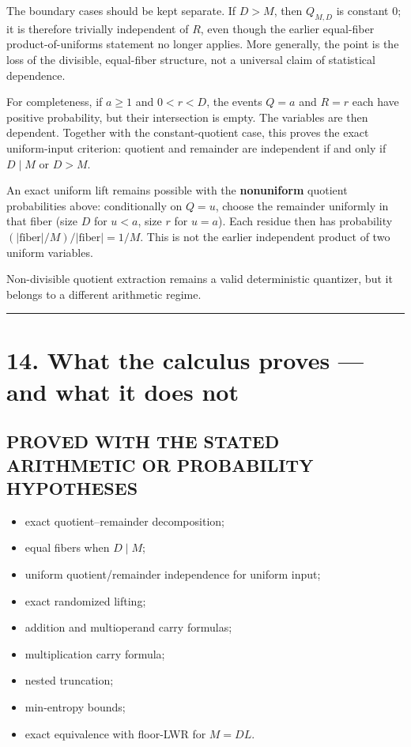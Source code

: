 \documentclass[11pt,a4paper]{article}
\providecommand{\tightlist}{\setlength{\itemsep}{0pt}\setlength{\parskip}{0pt}}
\begin{document}
The boundary cases should be kept separate. If \(D>M\), then \(Q_{M,D}\) is constant \(0\); it is therefore trivially independent of \(R\), even though the earlier equal-fiber product-of-uniforms statement no longer applies. More generally, the point is the loss of the divisible, equal-fiber structure, not a universal claim of statistical dependence.

For completeness, if \(a\ge1\) and \(0<r<D\), the events \(Q=a\) and \(R=r\) each have positive probability, but their intersection is empty. The variables are then dependent. Together with the constant-quotient case, this proves the exact uniform-input criterion: quotient and remainder are independent if and only if \(D\mid M\) or \(D>M\).

An exact uniform lift remains possible with the \textbf{nonuniform} quotient probabilities above: conditionally on \(Q=u\), choose the remainder uniformly in that fiber (size \(D\) for \(u<a\), size \(r\) for \(u=a\)). Each residue then has probability \((|\mathrm{fiber}|/M)/|\mathrm{fiber}|=1/M\). This is not the earlier independent product of two uniform variables.

Non-divisible quotient extraction remains a valid deterministic quantizer, but it belongs to a different arithmetic regime.

\begin{center}\rule{0.5\linewidth}{0.5pt}\end{center}

\section{14. What the calculus proves --- and what it does not}\label{what-the-calculus-proves-and-what-it-does-not}

\subsection{PROVED WITH THE STATED ARITHMETIC OR PROBABILITY HYPOTHESES}\label{proved-with-the-stated-arithmetic-or-probability-hypotheses}

\begin{itemize}
\tightlist
\item
  exact quotient--remainder decomposition;
\item
  equal fibers when \(D\mid M\);
\item
  uniform quotient/remainder independence for uniform input;
\item
  exact randomized lifting;
\item
  addition and multioperand carry formulas;
\item
  multiplication carry formula;
\item
  nested truncation;
\item
  min-entropy bounds;
\item
  exact equivalence with floor-LWR for \(M=DL\).
\end{itemize}
\end{document}
